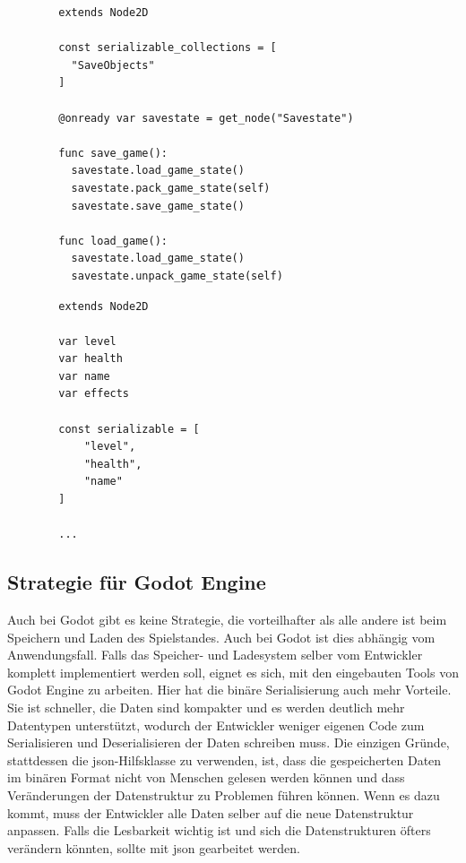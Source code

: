 \begin{listing}[htp]
    \begin{verbatim}
        extends Node2D

        const serializable_collections = [
          "SaveObjects"
        ]

        @onready var savestate = get_node("Savestate")

        func save_game():
          savestate.load_game_state()
          savestate.pack_game_state(self)  
          savestate.save_game_state()

        func load_game():
          savestate.load_game_state()
          savestate.unpack_game_state(self)
    \end{verbatim}
    \caption{Speichern und Laden des "SaveObjects"-Knoten mit Thoth \cite{stupidratstudioGodotSaveLoad}}
    \label{lst:godotThoth}
\end{listing} 

\begin{listing}[htp]
    \begin{verbatim}
        extends Node2D

        var level
        var health
        var name
        var effects

        const serializable = [
            "level",
            "health",
            "name"
        ]

        ...
    \end{verbatim}
    \caption{Thoth-Einstellung, welche Variablen einer Klasse serialisiert werden sollen \cite{stupidratstudioGodotSaveLoad}}
    \label{lst:godotThothObject}
\end{listing} 



\subsection{Strategie für Godot Engine}
Auch bei Godot gibt es keine Strategie, die vorteilhafter als alle andere ist beim Speichern und Laden des Spielstandes. Auch bei Godot ist dies abhängig vom Anwendungsfall. Falls das Speicher- und Ladesystem selber vom Entwickler komplett implementiert werden soll, eignet es sich, mit den eingebauten Tools von Godot Engine zu arbeiten. Hier hat die binäre Serialisierung auch mehr Vorteile. Sie ist schneller, die Daten sind kompakter und es werden deutlich mehr Datentypen unterstützt, wodurch der Entwickler weniger eigenen Code zum Serialisieren und Deserialisieren der Daten schreiben muss. Die einzigen Gründe, stattdessen die \ac{json}-Hilfsklasse zu verwenden, ist, dass die gespeicherten Daten im binären Format nicht von Menschen gelesen werden können und dass Veränderungen der Datenstruktur zu Problemen führen können. Wenn es dazu kommt, muss der Entwickler alle Daten selber auf die neue Datenstruktur anpassen. Falls die Lesbarkeit wichtig ist und sich die Datenstrukturen öfters verändern könnten, sollte mit \ac{json} gearbeitet werden.

